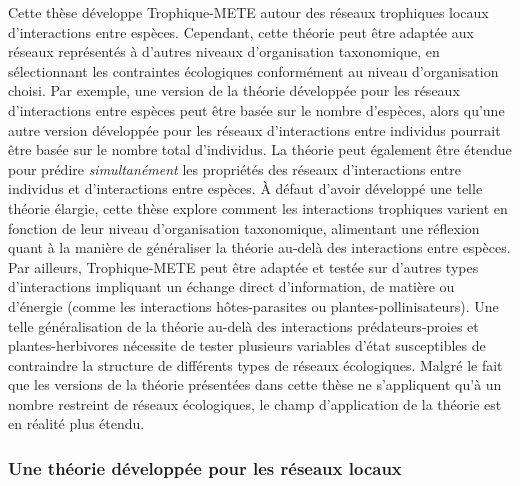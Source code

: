 Cette thèse développe Trophique-METE autour des réseaux trophiques locaux
d'interactions entre espèces. Cependant, cette théorie peut être adaptée aux
réseaux représentés à d'autres niveaux d'organisation taxonomique, en
sélectionnant les contraintes écologiques conformément au niveau d'organisation
choisi. Par exemple, une version de la théorie développée pour les réseaux
d'interactions entre espèces peut être basée sur le nombre d'espèces, alors
qu'une autre version développée pour les réseaux d'interactions entre individus
pourrait être basée sur le nombre total d'individus. La théorie peut également
être étendue pour prédire \textit{simultanément} les propriétés des réseaux
d'interactions entre individus et d'interactions entre espèces. À défaut d'avoir
développé une telle théorie élargie, cette thèse explore comment les
interactions trophiques varient en fonction de leur niveau d'organisation
taxonomique, alimentant une réflexion quant à la manière de généraliser la
théorie au-delà des interactions entre espèces. Par ailleurs, Trophique-METE
peut être adaptée et testée sur d'autres types d'interactions impliquant un
échange direct d'information, de matière ou d'énergie (comme les interactions
hôtes-parasites ou plantes-pollinisateurs). Une telle généralisation de la
théorie au-delà des interactions prédateurs-proies et plantes-herbivores
nécessite de tester plusieurs variables d'état susceptibles de contraindre la
structure de différents types de réseaux écologiques. Malgré le fait que les
versions de la théorie présentées dans cette thèse ne s'appliquent qu'à un
nombre restreint de réseaux écologiques, le champ d'application de la théorie
est en réalité plus étendu.

\subsubsection{Une théorie développée pour les réseaux locaux} 


